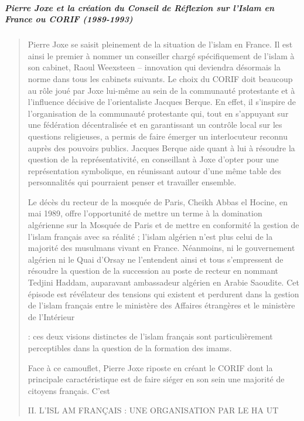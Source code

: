 \hypertarget{pierre-joxe-et-la-cruxe9ation-du-conseil-de-ruxe9flexion-sur-lislam-en-france-ou-corif-1989-1993}{%
\subparagraph{Pierre Joxe et la création du Conseil de Réflexion sur
l'Islam en France ou CORIF
(1989-1993)}\label{pierre-joxe-et-la-cruxe9ation-du-conseil-de-ruxe9flexion-sur-lislam-en-france-ou-corif-1989-1993}}

\begin{quote}
Pierre Joxe se saisit pleinement de la situation de l'islam en France.
Il est ainsi le premier à nommer un conseiller chargé spécifiquement de
l'islam à son cabinet, Raoul Weexsteen -- innovation qui deviendra
désormais la norme dans tous les cabinets suivants. Le choix du CORIF
doit beaucoup au rôle joué par Joxe lui-même au sein de la communauté
protestante et à l'influence décisive de l'orientaliste Jacques Berque.
En effet, il s'inspire de l'organisation de la communauté protestante
qui, tout en s'appuyant sur une fédération décentralisée et en
garantissant un contrôle local sur les questions religieuses, a permis
de faire émerger un interlocuteur reconnu auprès des pouvoirs publics.
Jacques Berque aide quant à lui à résoudre la question de la
représentativité, en conseillant à Joxe d'opter pour une représentation
symbolique, en réunissant autour d'une même table des personnalités qui
pourraient penser et travailler ensemble.

Le décès du recteur de la mosquée de Paris, Cheikh Abbas el Hocine, en
mai 1989, offre l'opportunité de mettre un terme à la domination
algérienne sur la Mosquée de Paris et de mettre en conformité la gestion
de l'islam français avec sa réalité ; l'islam algérien n'est plus celui
de la majorité des musulmans vivant en France. Néanmoins, ni le
gouvernement algérien ni le Quai d'Orsay ne l'entendent ainsi et tous
s'empressent de résoudre la question de la succession au poste de
recteur en nommant Tedjini Haddam, auparavant ambassadeur algérien en
Arabie Saoudite. Cet épisode est révélateur des tensions qui existent et
perdurent dans la gestion de l'islam français entre le ministère des
Affaires étrangères et le ministère de l'Intérieur

: ces deux visions distinctes de l'islam français sont particulièrement
perceptibles dans la question de la formation des imams.

Face à ce camouflet, Pierre Joxe riposte en créant le CORIF dont la
principale caractéristique est de faire siéger en son sein une majorité
de citoyens français. C'est

II. L'ISL AM FRANÇAIS : UNE ORGANISATION PAR LE HA UT


\end{quote}
